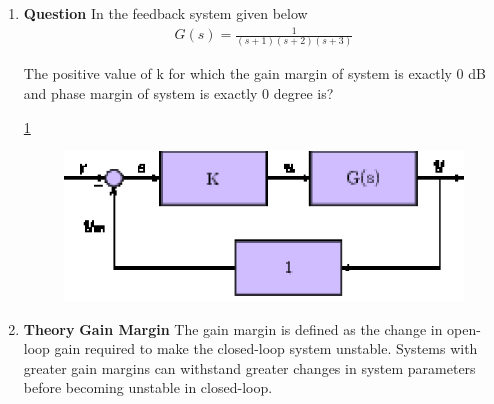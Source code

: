\begin{enumerate}[label=\thesection.\arabic*.,ref=\thesection.\theenumi]
\item
\textbf{Question}
In the feedback system given below 
\begin{align}
G(s) = \frac{1}{(s+1)(s+2)(s+3)}
\end{align}

The positive value of k for which the gain margin of system is exactly 0 dB and phase margin of system is exactly 0 degree is?
\begin{figure}[!ht]
	\begin{center}
		
		\resizebox{\columnwidth}{!}{}
	\end{center}
\caption{}
\label{fig:ee18btech11036}
\end{figure}

\ref{fig:ee18btech11036}

\begin{figure}
\centering
\includegraphics[width=\columnwidth]{./figs/ee18btech11036.eps}
\end{figure}
\item




\textbf{Theory}
\newline
\textbf{Gain Margin}
The gain margin is defined as the change in open-loop gain required to make the closed-loop system unstable. Systems with greater gain margins can withstand greater changes in system parameters before becoming unstable in closed-loop. 


\end{enumerate}
